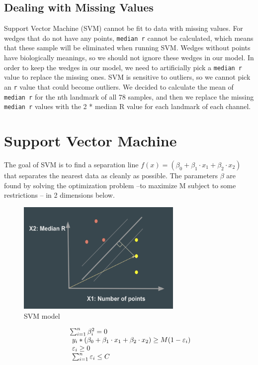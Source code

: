 \documentclass[10pt,letterpaper]{article}
\begin{document}
\subsection{Dealing with Missing
Values}\label{dealing-with-missing-values}

Support Vector Machine (SVM) cannot be fit to data with missing values.
For wedges that do not have any points, \texttt{median\ r} cannot be
calculated, which means that these sample will be eliminated when
running SVM. Wedges without points have biologically meanings, so we
should not ignore these wedges in our model. In order to keep the wedges
in our model, we need to artificially pick a \texttt{median\ r} value to
replace the missing ones. SVM is sensitive to outliers, so we cannot
pick an \texttt{r} value that could become outliers. We decided to
calculate the mean of \texttt{median\ r} for the nth landmark of all 78
samples, and then we replace the missing \texttt{median\ r} values with
the 2 * median R value for each landmark of each channel.

\section{Support Vector Machine}\label{support-vector-machine}

The goal of SVM is to find a separation line
\(f(x) = (\beta_0 + \beta_1 \cdot x_1 + \beta_2 \cdot x_2)\) that
separates the nearest data as cleanly as possible. The parameters
\(\beta\) are found by solving the optimization problem --to maximize M
subject to some restrictions -- in 2 dimensions below.

\begin{figure}[h]
\includegraphics[width=3.12in]{figures/svm_fig} \caption{SVM model}\label{fig:svmfig}
\end{figure}

\begin{equation}
  \left.
  \begin{array}{l@{\,}l}
     \sum_{i=1}^n \beta_i^2 = 0 \\
     \ y_i * ( \beta_0 + \beta_1 \cdot x_1 + \beta_2 \cdot x_2 ) \geq M(1-\varepsilon_i) \\
     \ \varepsilon_i \geq 0 \\
     \ \sum_{i=1}^n \varepsilon_i \leq C \\
  \end{array}
  \right.
\end{equation}
\end{document}
